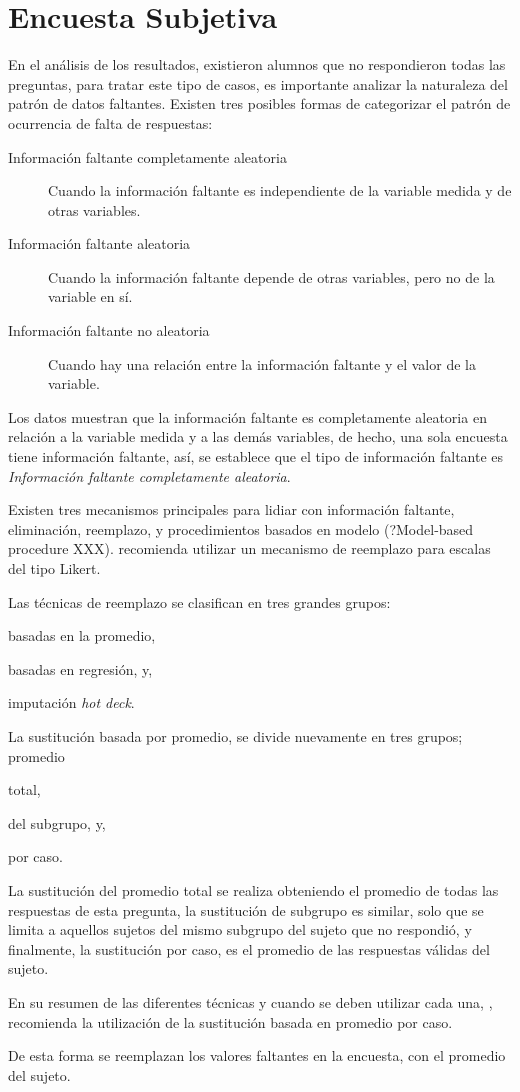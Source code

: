 \section{Encuesta Subjetiva}

En el análisis de los resultados, existieron alumnos que no respondieron todas
las preguntas, para tratar este tipo de casos, es importante analizar la
naturaleza del patrón de datos faltantes\cite{carpita2011imputation}. Existen
tres posibles formas de categorizar el patrón de ocurrencia de falta de
respuestas\cite{leite2010performance}\cite{leite2010performance}\cite{tsikriktsis2005review}:


\begin{description}
    \item[Información faltante completamente aleatoria] Cuando la información
        faltante es independiente de la variable medida y de otras variables.
    \item[Información faltante aleatoria] Cuando la información faltante depende
        de otras variables, pero no de la variable en sí. 
    \item[Información faltante no aleatoria] Cuando hay una relación entre la
        información faltante y el valor de la variable.
\end{description}

Los datos muestran que la información faltante es completamente aleatoria en
relación a la variable medida y a las demás variables, de hecho, una sola
encuesta tiene información faltante, así, se establece que el tipo de
información faltante es \emph{Información faltante completamente aleatoria}.

Existen tres mecanismos\cite{tsikriktsis2005review} principales para lidiar con
información faltante, eliminación, reemplazo, y procedimientos basados en modelo
(?Model-based procedure XXX).\cite{tsikriktsis2005review} recomienda utilizar
un mecanismo de reemplazo para escalas del tipo Likert.

Las técnicas de reemplazo se clasifican en tres grandes
grupos\cite{tsikriktsis2005review}:
\begin{enumerate*}[label=\itshape\alph*\upshape.]
\item basadas en la promedio,
\item basadas en regresión, y,
\item imputación \emph{hot deck}.
\end{enumerate*}

La sustitución basada por promedio, se divide nuevamente en tres grupos;
promedio
\begin{enumerate*}[label=\itshape\alph*\upshape.]
\item total,
\item del subgrupo, y,
\item por caso.
\end{enumerate*}
La sustitución del promedio total se realiza obteniendo el promedio de todas las
respuestas de esta pregunta, la sustitución de subgrupo es similar, solo que se
limita a aquellos sujetos del mismo subgrupo del sujeto que no respondió, y
finalmente, la sustitución por caso, es el promedio de las respuestas válidas
del sujeto.

En su resumen de las diferentes técnicas y cuando se deben utilizar cada una,
\cite{tsikriktsis2005review}, recomienda la utilización de la sustitución basada
en promedio por caso. 

De esta forma se reemplazan los valores faltantes en la encuesta, con el
promedio del sujeto.

